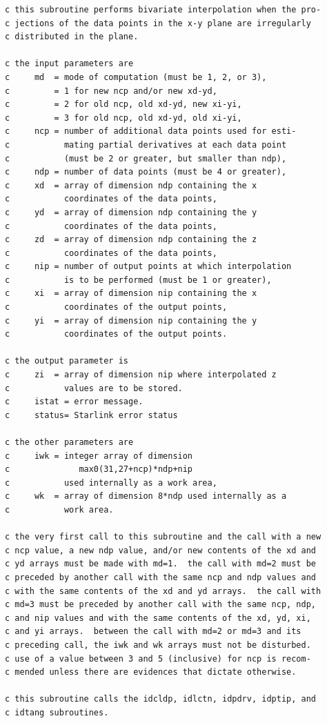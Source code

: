 \documentclass[11pt,twoside]{article}
\begin{document}
\begin{verbatim}
c this subroutine performs bivariate interpolation when the pro-
c jections of the data points in the x-y plane are irregularly
c distributed in the plane.
 
c the input parameters are
c     md  = mode of computation (must be 1, 2, or 3),
c         = 1 for new ncp and/or new xd-yd,
c         = 2 for old ncp, old xd-yd, new xi-yi,
c         = 3 for old ncp, old xd-yd, old xi-yi,
c     ncp = number of additional data points used for esti-
c           mating partial derivatives at each data point
c           (must be 2 or greater, but smaller than ndp),
c     ndp = number of data points (must be 4 or greater),
c     xd  = array of dimension ndp containing the x
c           coordinates of the data points,
c     yd  = array of dimension ndp containing the y
c           coordinates of the data points,
c     zd  = array of dimension ndp containing the z
c           coordinates of the data points,
c     nip = number of output points at which interpolation
c           is to be performed (must be 1 or greater),
c     xi  = array of dimension nip containing the x
c           coordinates of the output points,
c     yi  = array of dimension nip containing the y
c           coordinates of the output points.
 
c the output parameter is
c     zi  = array of dimension nip where interpolated z
c           values are to be stored.
c     istat = error message.
c     status= Starlink error status
 
c the other parameters are
c     iwk = integer array of dimension
c              max0(31,27+ncp)*ndp+nip
c           used internally as a work area,
c     wk  = array of dimension 8*ndp used internally as a
c           work area.
 
c the very first call to this subroutine and the call with a new
c ncp value, a new ndp value, and/or new contents of the xd and
c yd arrays must be made with md=1.  the call with md=2 must be
c preceded by another call with the same ncp and ndp values and
c with the same contents of the xd and yd arrays.  the call with
c md=3 must be preceded by another call with the same ncp, ndp,
c and nip values and with the same contents of the xd, yd, xi,
c and yi arrays.  between the call with md=2 or md=3 and its
c preceding call, the iwk and wk arrays must not be disturbed.
c use of a value between 3 and 5 (inclusive) for ncp is recom-
c mended unless there are evidences that dictate otherwise.
 
c this subroutine calls the idcldp, idlctn, idpdrv, idptip, and
c idtang subroutines.
\end{verbatim}
\end{document}
